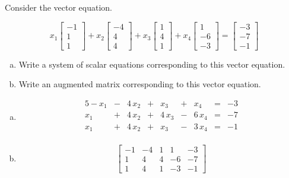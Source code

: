 
\begin{exerciseStatement}


Consider the vector equation.

\[ x_{1} \left[\begin{array}{c}
-1 \\
1 \\
1
\end{array}\right] + x_{2} \left[\begin{array}{c}
-4 \\
4 \\
4
\end{array}\right] + x_{3} \left[\begin{array}{c}
1 \\
4 \\
1
\end{array}\right] + x_{4} \left[\begin{array}{c}
1 \\
-6 \\
-3
\end{array}\right] = \left[\begin{array}{c}
-3 \\
-7 \\
-1
\end{array}\right] \]
\begin{enumerate}[(a)]
\item  Write a system of scalar equations corresponding to this vector equation. 
\item  Write an augmented matrix corresponding to this vector equation. 
\end{enumerate}
    
\end{exerciseStatement}
    
\begin{exerciseAnswer} 

\begin{enumerate}[(a)]
\item 
\begin{alignat*}{5} -x_{1} &-& 4 \, x_{2} &+& x_{3} &+& x_{4} &=& -3 \\x_{1} &+& 4 \, x_{2} &+& 4 \, x_{3} &-& 6 \, x_{4} &=& -7 \\x_{1} &+& 4 \, x_{2} &+& x_{3} &-& 3 \, x_{4} &=& -1 \\ \end{alignat*}
            
\item \[ \left[\begin{array}{cccc|c}
-1 & -4 & 1 & 1 & -3 \\
1 & 4 & 4 & -6 & -7 \\
1 & 4 & 1 & -3 & -1
\end{array}\right] \]
\end{enumerate}
    
\end{exerciseAnswer}
    
